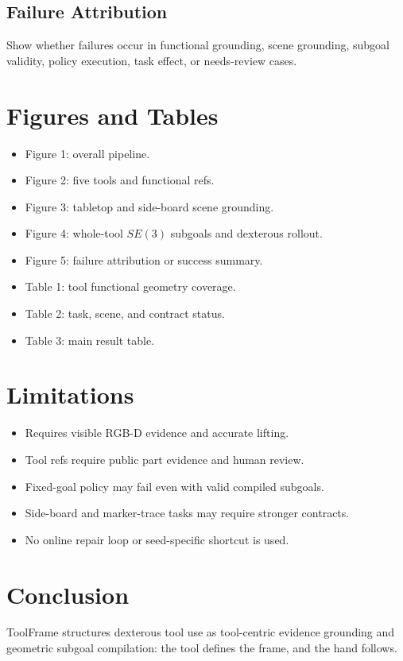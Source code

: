 \documentclass[journal]{IEEEtran}
\newcommand{\method}{ToolFrame}
\begin{document}
\subsection{Failure Attribution}
Show whether failures occur in functional grounding, scene grounding, subgoal
validity, policy execution, task effect, or needs-review cases.

\section{Figures and Tables}
\begin{itemize}
  \item Figure 1: overall pipeline.
  \item Figure 2: five tools and functional refs.
  \item Figure 3: tabletop and side-board scene grounding.
  \item Figure 4: whole-tool $SE(3)$ subgoals and dexterous rollout.
  \item Figure 5: failure attribution or success summary.
  \item Table 1: tool functional geometry coverage.
  \item Table 2: task, scene, and contract status.
  \item Table 3: main result table.
\end{itemize}

\section{Limitations}
\begin{itemize}
  \item Requires visible RGB-D evidence and accurate lifting.
  \item Tool refs require public part evidence and human review.
  \item Fixed-goal policy may fail even with valid compiled subgoals.
  \item Side-board and marker-trace tasks may require stronger contracts.
  \item No online repair loop or seed-specific shortcut is used.
\end{itemize}

\section{Conclusion}
\method{} structures dexterous tool use as tool-centric evidence grounding and
geometric subgoal compilation: the tool defines the frame, and the hand
follows.
\end{document}
